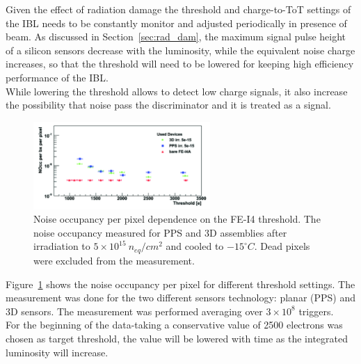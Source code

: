Given the effect of radiation damage the threshold and charge-to-ToT settings of the IBL needs to be constantly monitor and adjusted periodically in presence of beam. As discussed in Section~\ref{sec:rad_dam}, the maximum signal pulse height of a silicon sensors decrease with the luminosity, while the equivalent noise charge increases, so that the threshold will need to be lowered for keeping high efficiency performance of the IBL.\\
While lowering the threshold allows to detect low charge signals, it also increase the possibility that noise pass the discriminator and it is treated as a signal.
\begin{figure}
\centering
\includegraphics[width=0.6\textwidth]{Images/IBL_commissioning/occupancy_vs_threshold.png}
\caption{Noise occupancy per pixel dependence on the FE-I4 threshold. The noise occupancy measured for PPS and 3D assemblies after irradiation to $5\times10^{15}~n_{eq}/cm^2$ and cooled to $-15^{\circ}C$. Dead pixels were excluded from the measurement. \cite{DavidPohl}}
\label{pic:noise_occupancy}
\end{figure}
Figure~\ref{pic:noise_occupancy} shows the noise occupancy per pixel for different threshold settings\cite{PohlLeon}. The measurement was done for the two different sensors technology: planar (PPS) and 3D sensors. The measurement was performed averaging over $3\times10^8$ triggers.\\
For the beginning of the data-taking a conservative value of 2500 electrons was chosen as target threshold, the value will be lowered with time as the integrated luminosity will increase.




